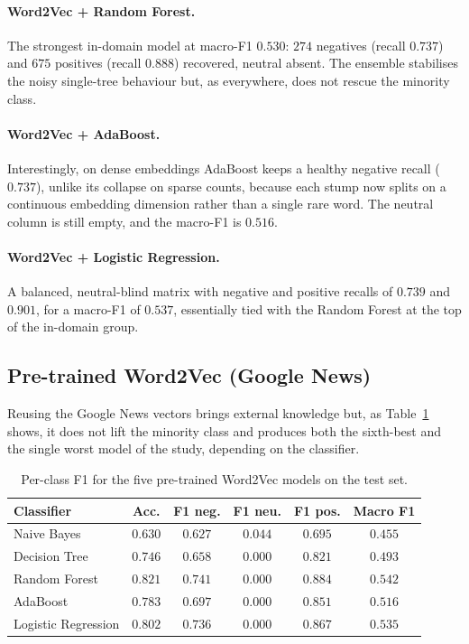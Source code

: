 \documentclass[11pt,a4paper]{article}
\begin{document}
\paragraph{Word2Vec + Random Forest.} The strongest in-domain model at macro-F1 $0.530$:
$274$ negatives (recall $0.737$) and $675$ positives (recall $0.888$) recovered, neutral
absent. The ensemble stabilises the noisy single-tree behaviour but, as everywhere, does not
rescue the minority class.

\paragraph{Word2Vec + AdaBoost.} Interestingly, on dense embeddings AdaBoost keeps a healthy
negative recall ($0.737$), unlike its collapse on sparse counts, because each stump now
splits on a continuous embedding dimension rather than a single rare word. The neutral
column is still empty, and the macro-F1 is $0.516$.

\paragraph{Word2Vec + Logistic Regression.} A balanced, neutral-blind matrix with negative
and positive recalls of $0.739$ and $0.901$, for a macro-F1 of $0.537$, essentially tied with
the Random Forest at the top of the in-domain group.

\subsection{Pre-trained Word2Vec (Google News)}
Reusing the Google News vectors brings external knowledge but, as Table~\ref{tab:w2vp}
shows, it does not lift the minority class and produces both the sixth-best and the single
worst model of the study, depending on the classifier.

\begin{table}[H]
\centering
\begin{tabular}{lccccc}
\toprule
\textbf{Classifier} & \textbf{Acc.} & \textbf{F1 neg.} & \textbf{F1 neu.} & \textbf{F1 pos.} & \textbf{Macro F1} \\
\midrule
Naive Bayes & $0.630$ & $0.627$ & $0.044$ & $0.695$ & $0.455$ \\
Decision Tree & $0.746$ & $0.658$ & $0.000$ & $0.821$ & $0.493$ \\
Random Forest & $0.821$ & $0.741$ & $0.000$ & $0.884$ & $\mathbf{0.542}$ \\
AdaBoost & $0.783$ & $0.697$ & $0.000$ & $0.851$ & $0.516$ \\
Logistic Regression & $0.802$ & $0.736$ & $0.000$ & $0.867$ & $0.535$ \\
\bottomrule
\end{tabular}
\caption{Per-class F1 for the five pre-trained Word2Vec models on the test set.}
\label{tab:w2vp}
\end{table}
\end{document}
